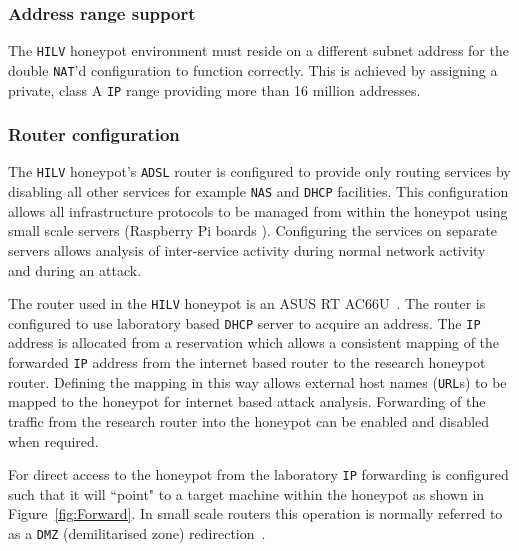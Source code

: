 \subsubsection{Address range support}
The \texttt{HILV} honeypot environment must reside on a different subnet address for the double \texttt{NAT}'d configuration to function correctly. This is achieved by assigning a private, class A \texttt{IP} range providing more than 16 million addresses.

\subsubsection{Router configuration}
The \texttt{HILV} honeypot's \texttt{ADSL} router is configured to provide only routing services by disabling all other services for example \texttt{NAS} and \texttt{DHCP} facilities. This configuration allows all infrastructure protocols to be managed from within the honeypot using small scale servers (Raspberry Pi boards \cite{RASP:17}). Configuring the services on separate servers allows analysis of inter-service activity during normal network activity and during an attack.

The router used in the \texttt{HILV} honeypot is an ASUS RT AC66U~\cite{ASUS:17}. The router is configured to use laboratory based \texttt{DHCP} server to acquire an  address. The \texttt{IP} address is allocated from a reservation which allows a consistent mapping of the forwarded \texttt{IP} address from the internet based router to the research honeypot router. Defining the mapping in this way allows external host names (\texttt{URL}s) to be mapped to the honeypot for internet based attack analysis. Forwarding of the traffic from the research router into the honeypot can be enabled and disabled when required. 

For direct access to the honeypot from the laboratory \texttt{IP} forwarding is configured such that it will ``point" to a target machine within the honeypot as shown in Figure~\ref{fig:Forward}. In small scale routers this operation is normally referred to as a \texttt{DMZ} (demilitarised zone) redirection~\cite{DK:08,MB:01}. 

